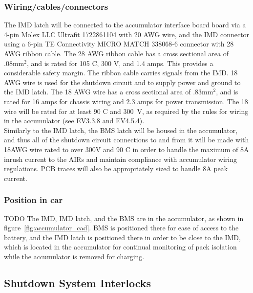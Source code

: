 \documentclass{article}
\begin{document}
\subsubsection{Wiring/cables/connectors}
The IMD latch will be connected to the accumulator interface board board via a 4-pin Molex LLC Ultrafit 1722861104 with 20 AWG wire, and the IMD connector using a  6-pin TE Connectivity MICRO MATCH 338068-6 connector with 28 AWG ribbon cable. The 28 AWG ribbon cable has a cross sectional area of .08mm$^2$, and is rated for 105 \textdegree C, 300 V, and 1.4 amps. This provides a considerable safety margin. The ribbon cable carries signals from the IMD. 18 AWG wire is used for the shutdown circuit and to supply power and ground to the IMD latch. The 18 AWG wire has a cross sectional area of .83mm$^2$, and is rated for 16 amps for chassis wiring and 2.3 amps for power transmission. The 18 wire will be rated for at least 90 \textdegree C and 300~V, as required by the rules for wiring in the accumulator (see EV3.3.8 and EV4.5.4).\\

Similarly to the IMD latch, the BMS latch will be housed in the accumulator, and thus all of the shutdown circuit connections to and from it will be made with 18AWG wire rated to over 300V and 90 \textdegree C in order to handle the maximum of 8A inrush current to the AIRs and maintain compliance with accumulator wiring regulations. PCB traces will also be appropriately sized to handle 8A peak current. 


\subsubsection{Position in car}
TODO
The IMD, IMD latch, and the BMS are in the accumulator, as shown in figure~\ref{fig:accumulator_cad}. BMS is positioned there for ease of access to the battery, and the IMD latch is positioned there in order to be close to the IMD, which is located in the accumulator for continual monitoring of pack isolation while the accumulator is removed for charging. 

\subsection{Shutdown System Interlocks}\label{shutdown_system_interlocks}
\end{document}
